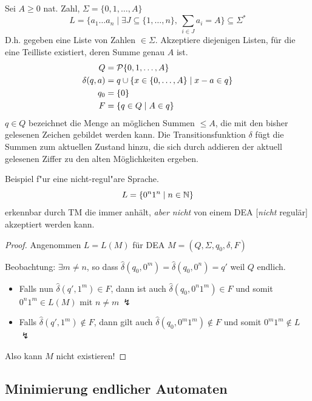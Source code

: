 \begin{Bsp}\label{bsp:3.2}
	
	Sei $A\ge 0$ nat. Zahl, $\Sigma=\{0,1,\dots,A\}$
	\begin{equation*}
		L = \{ a_1\dots a_n \mid \exists J\subseteq \{1,\dots,n \},\ \sum_{i\in J} a_i = A \} \subseteq \Sigma^* 
	\end{equation*}
	D.h. gegeben eine Liste von Zahlen $\in\Sigma$.
	Akzeptiere diejenigen Listen, für die eine Teilliste existiert, deren Summe genau $A$ ist.
	\begin{align*}
		Q &=\mathcal{P}\{0,1,\dots,A\} \\
		\delta(q,a) &= q \cup \{ x\in \{0,\dots,A\} \mid x-a \in q \} \\
		q_0 &=\{0\} \\
		F &= \{ q\in Q \mid A \in q \}
	\end{align*}
  $q \in Q$ bezeichnet die Menge an möglichen Summen $\le A$, die mit den bisher gelesenen Zeichen gebildet werden kann.
  Die Transitionsfunktion $\delta$ fügt die Summen zum aktuellen Zustand hinzu, die sich durch addieren der aktuell gelesenen Ziffer zu den alten Möglichkeiten ergeben.
\end{Bsp}
\begin{Bsp}\label{bsp:3.3}
	Beispiel f"ur eine nicht-regul"are Sprache.
	\begin{equation*}
		L = \{ 0^n1^n \mid n\in\mathbb{N} \} 
	\end{equation*}
	erkennbar durch \ac{TM} die immer anhält, \emph{aber nicht} von einem \ac{DEA} [\emph{nicht} regulär] akzeptiert werden kann.
	\begin{proof}
		Angenommen $L=L(M)$ für \ac{DEA} $M=(Q,\Sigma,q_0,\delta,F)$
		
		Beobachtung: $\exists m\neq n$, so dass $\hat\delta(q_0,0^m)=\hat\delta(q_0,0^n)=q'$ weil $Q$ endlich.
		\begin{itemize}
			\item Falls nun $\hat\delta(q',1^m)\in F$, dann ist auch $\hat\delta(q_0,0^n1^m)\in F$ und somit $0^n1^m\in L(M)$ mit $n\neq m\ \lightning$
			\item Falls $\hat\delta(q',1^m)\notin F$, dann gilt auch $\hat\delta(q_0,0^m1^m)\notin F$ und somit $0^m1^m \notin L$ $\lightning$
		\end{itemize}
		Also kann $M$ nicht existieren!
	\end{proof}
\end{Bsp}

\subsection{Minimierung endlicher Automaten}

